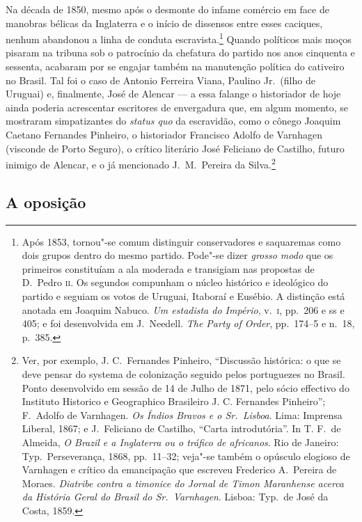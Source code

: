 Na década de 1850, mesmo após o desmonte do infame comércio em face de
manobras bélicas da Inglaterra e o início de dissensos entre esses
caciques, nenhum abandonou a linha de conduta escravista.\footnote{ Após 1853, 
tornou"-se comum distinguir conservadores e saquaremas como
dois grupos dentro do mesmo partido. Pode"-se dizer \textit{grosso
modo} que os primeiros constituíam a ala moderada e transigiam nas
propostas de D.~Pedro \textsc{ii}. Os segundos compunham o núcleo histórico e
ideológico do partido e seguiam os votos de Uruguai, Itaboraí e
Eusébio. A distinção está anotada em Joaquim Nabuco. \textit{Um
estadista do Império}, v.~\textsc{i}, pp.~206 e ss e 405; e foi desenvolvida em
J.~Needell. \textit{The Party of Order}, pp.~174--5 e n.~18, p.~385.} 
Quando políticos mais moços pisaram na tribuna sob o patrocínio da
chefatura do partido nos anos cinquenta e sessenta, acabaram por se
engajar também na manutenção política do cativeiro no Brasil. Tal foi o
caso de Antonio Ferreira Viana, Paulino Jr.~(filho de Uruguai) e,
finalmente, José de Alencar --- a essa falange o historiador de hoje
ainda poderia acrescentar escritores de envergadura que, em algum
momento, se mostraram simpatizantes do \textit{status quo} da
escravidão, como o cônego Joaquim Caetano Fernandes Pinheiro, o
historiador Francisco Adolfo de Varnhagen (visconde de Porto Seguro), o
crítico literário José Feliciano de Castilho, futuro inimigo de
Alencar, e o já mencionado J.~M.~Pereira da Silva.\footnote{ Ver, por exemplo, J. C.~Fernandes Pinheiro, 
``Discussão histórica: o que se deve pensar do systema de colonização seguido pelos portuguezes no Brasil. 
Ponto desenvolvido em sessão de 14 de Julho de 1871, pelo sócio effectivo do Instituto Historico e 
Geographico Brasileiro J. C. Fernandes Pinheiro''; F.~Adolfo de Varnhagen. \textit{Os Índios Bravos 
e o Sr.~Lisboa}. Lima: Imprensa Liberal, 1867; e J.~Feliciano de Castilho, ``Carta introdutória''. 
In T. F.~de Almeida, \textit{O Brazil e a Inglaterra ou o tráfico de africanos}. Rio de Janeiro: Typ.~Perseverança, 
1868, pp.~11--32; veja"-se também o opúsculo elogioso de Varnhagen e crítico da emancipação que escreveu 
Frederico A.~Pereira de Moraes. \textit{Diatribe contra a timonice do Jornal de Timon Maranhense acerca da 
História Geral do Brasil do Sr.~Varnhagen}. Lisboa: Typ.~de José da Costa, 1859.}  

\subsection{A oposição}

